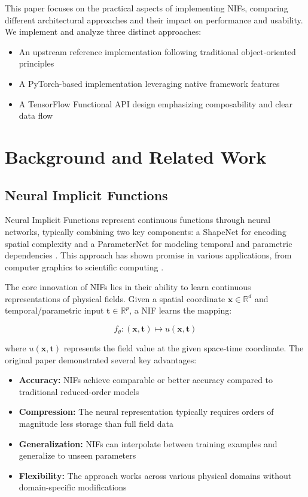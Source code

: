 \documentclass[10pt,journal,compsoc]{IEEEtran}
\begin{document}
This paper focuses on the practical aspects of implementing NIFs, comparing different architectural approaches and their impact on performance and usability. We implement and analyze three distinct approaches:
\begin{itemize}
    \item An upstream reference implementation following traditional object-oriented principles
    \item A PyTorch-based implementation leveraging native framework features
    \item A TensorFlow Functional API design emphasizing composability and clear data flow
\end{itemize}

\section{Background and Related Work}
\subsection{Neural Implicit Functions}
Neural Implicit Functions represent continuous functions through neural networks, typically combining two key components: a ShapeNet for encoding spatial complexity and a ParameterNet for modeling temporal and parametric dependencies \cite{nif2023}. This approach has shown promise in various applications, from computer graphics to scientific computing \cite{neural_fields2022}.

The core innovation of NIFs lies in their ability to learn continuous representations of physical fields. Given a spatial coordinate $\mathbf{x} \in \mathbb{R}^d$ and temporal/parametric input $\mathbf{t} \in \mathbb{R}^p$, a NIF learns the mapping:

\begin{equation}
    f_\theta: (\mathbf{x}, \mathbf{t}) \mapsto u(\mathbf{x}, \mathbf{t})
\end{equation}

where $u(\mathbf{x}, \mathbf{t})$ represents the field value at the given space-time coordinate. The original paper demonstrated several key advantages:

\begin{itemize}
    \item \textbf{Accuracy:} NIFs achieve comparable or better accuracy compared to traditional reduced-order models
    \item \textbf{Compression:} The neural representation typically requires orders of magnitude less storage than full field data
    \item \textbf{Generalization:} NIFs can interpolate between training examples and generalize to unseen parameters
    \item \textbf{Flexibility:} The approach works across various physical domains without domain-specific modifications
\end{itemize}
\end{document}
